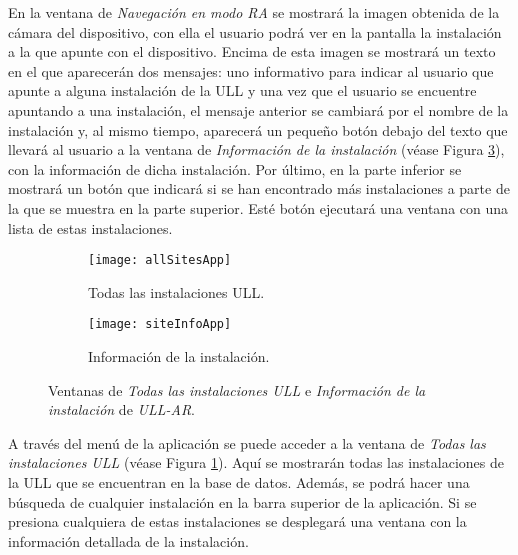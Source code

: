 
En la ventana de \textit{Navegación en modo RA} se mostrará la imagen obtenida de la cámara del dispositivo, con ella el usuario podrá ver en la pantalla la instalación a la que apunte con el dispositivo. Encima de esta imagen se mostrará un texto en el que aparecerán dos mensajes: uno informativo para indicar al usuario que apunte a alguna instalación de la ULL y una vez que el usuario se encuentre apuntando a una instalación, el mensaje anterior se cambiará por el nombre de la instalación y, al mismo tiempo, aparecerá un pequeño botón debajo del texto que llevará al usuario a la ventana de \textit{Información de la instalación} (véase Figura \ref{fig:siteInfoApp}), con la información de dicha instalación. Por último, en la parte inferior se mostrará un botón que indicará si se han encontrado más instalaciones a parte de la que se muestra en la parte superior. Esté botón ejecutará una ventana con una lista de estas instalaciones.

 
\begin{figure}[h]
    \hspace*{\fill}%
    \begin{subfigure}[h]{0.37\linewidth}
    \texttt{[image: allSitesApp]}
    \caption{Todas las instalaciones ULL.}
    \label{fig:allSitesApp}
    \end{subfigure}
    \hfill%
    \begin{subfigure}[h]{0.37\linewidth}
    \texttt{[image: siteInfoApp]}
    \caption{Información de la instalación.}
    \label{fig:siteInfoApp}
    \end{subfigure}%
    \caption{Ventanas de \textit{Todas las instalaciones ULL} e \textit{Información de la instalación} de \textit{ULL-AR}.}
    \hspace*{\fill}%
\end{figure}
\bigskip

A través del menú de la aplicación se puede acceder a la ventana de \textit{Todas las instalaciones ULL} (véase Figura \ref{fig:allSitesApp}). Aquí se mostrarán todas las instalaciones de la ULL que se encuentran en la base de datos. Además, se podrá hacer una búsqueda de cualquier instalación en la barra superior de la aplicación. Si se presiona cualquiera de estas instalaciones se  desplegará una ventana con la información detallada de la instalación.


